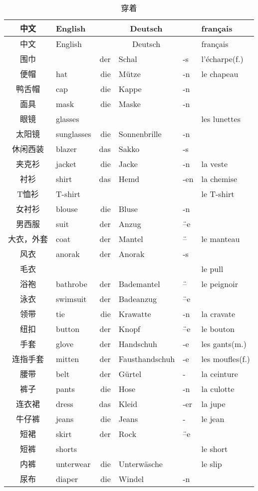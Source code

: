 \documentclass[12pt,A4paper,oneside,reqno]{amsart}
\numberwithin{equation}{section}
\theoremstyle{plain}
\theoremstyle{plain}
\theoremstyle{plain}
\numberwithin{equation}{section}
\theoremstyle{remark}
\begin{document}
\begin{longtable}{c|l|rll|l}
	\hline
	中文	&	English	&\multicolumn{3}{c|}{Deutsch} &	français  	\\
	\hline
	\endhead
	\hline
	中文	&	English	&\multicolumn{3}{c|}{Deutsch} &	français  	\\
	\hline
	\endfirsthead	
	\hline
	\endfoot
	\hline	
	\caption{穿着}
	\endlastfoot				
围巾	&		&	der	&	Schal	&	-s	&	l'\'{e}charpe(f.)	\\
便帽	&	hat	&	die	&	M\"{u}tze	&	-n	&	le chapeau	\\
鸭舌帽	&	cap	&	die	&	Kappe	&	-n	&		\\
面具	&	mask	&	die	&	Maske	&	-n	&		\\
眼镜	&	glasses	&		&		&		&	les lunettes	\\
太阳镜	&	sunglasses	&	die	&	Sonnenbrille	&	-n	&		\\

休闲西装	&	blazer	&	das	&	Sakko	&	-s	&		\\
夹克衫	&	jacket	&	die	&	Jacke	&	-n	&	la veste	\\
衬衫	&	shirt	&	das	&	Hemd	&	-en	&	la chemise	\\
T恤衫	&	T-shirt	&		&		&		&	le T-shirt	\\
女衬衫	&	blouse	&	die	&	Bluse	&	-n	&		\\
男西服	&	suit	&	der	&	Anzug	&	\"{--}e	&		\\
大衣，外套	&	coat	&	der	&	Mantel	&	\"{--}	&	le manteau	\\
风衣	&	anorak	&	der	&	Anorak	&	-s	&		\\
毛衣	&		&		&		&		&	le pull	\\
浴袍	&	bathrobe	&	der	&	Bademantel	&	\"{--}	&	le peignoir	\\
泳衣	&	swimsuit	&	der	&	Badeanzug	&	\"{--}e	&		\\
领带	&	tie	&	die	&	Krawatte	&	-n	&	la cravate	\\
纽扣	&	button	&	der	&	Knopf	&	\"{--}e	&	le bouton	\\
手套	&	glove	&	der	&	Handschuh	&	-e	&	les gants(m.)	\\
连指手套	&	mitten	&	der	&	Fausthandschuh	&	-e	&	les moufles(f.)	\\
腰带	&	belt	&	der	&	G\"{u}rtel	&	-	&	la ceinture	\\

裤子	&	pants	&	die	&	Hose	&	-n	&	la culotte	\\
连衣裙	&	dress	&	das	&	Kleid	&	-er	&	la jupe	\\
牛仔裤	&	jeans	&	die	&	Jeans	&	-	&	le jean	\\
短裙	&	skirt	&	der	&	Rock	&	\"{--}e	&		\\
短裤	&	shorts	&		&		&		&	le short	\\
内裤	&	unterwear	&	die	&	Unterw\"{a}sche	&		&	le slip	\\
尿布	&	diaper	&	die	&	Windel	&	-n	&		\\


\end{longtable}
\end{document}
